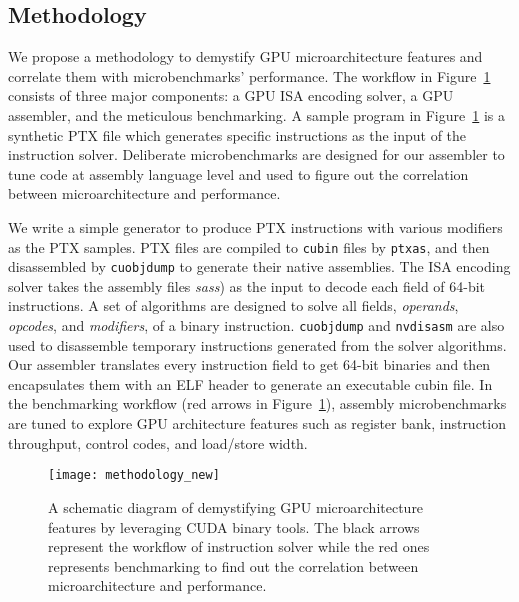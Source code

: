 \subsection{Methodology}


We propose a methodology to demystify GPU microarchitecture features and correlate them with microbenchmarks' performance.
The workflow in Figure~\ref{fig:workflow} consists of three major components: a GPU ISA encoding solver, a GPU assembler, and the meticulous benchmarking.
A sample program in Figure~\ref{fig:workflow} is a synthetic PTX file which generates specific instructions as the input of the instruction solver.
Deliberate microbenchmarks are designed for our assembler to tune code at assembly language level and used to figure out the correlation between microarchitecture and performance.

We write a simple generator to produce PTX instructions with various modifiers as the PTX samples.
PTX files are compiled to {\tt cubin} files by {\tt ptxas}, and then disassembled by {\tt cuobjdump} to generate their native assemblies. 
The ISA encoding solver takes the assembly files {\em sass}) as the input to decode each field of 64-bit instructions.
A set of algorithms are designed to solve all fields, {\em operands}, {\em opcodes}, and {\em modifiers}, of a binary instruction.
{\tt cuobjdump} and {\tt nvdisasm} are also used to disassemble temporary instructions generated from the solver algorithms.
Our assembler translates every instruction field to get 64-bit binaries and then encapsulates them with an ELF header to generate an executable cubin file.
In the benchmarking workflow (red arrows in Figure~\ref{fig:workflow}), assembly microbenchmarks are tuned to explore GPU architecture features such as register bank, instruction throughput, control codes, and load/store width.


\begin{figure}[htbp]
\begin{center}
    \texttt{[image: methodology\_new]}
\caption{A schematic diagram of demystifying GPU microarchitecture features by leveraging CUDA binary tools. The black arrows
    represent the workflow of instruction solver while the red ones represents benchmarking to find out the correlation between microarchitecture and performance.}
\label{fig:workflow}
\end{center}
\end{figure}
